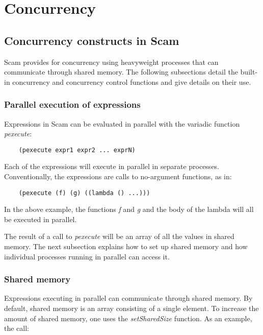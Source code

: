 \chapter{Concurrency}
\label{Concurrency}

\section{Concurrency constructs in Scam}

Scam provides for concurrency using heavyweight processes that
can communicate through shared memory. The following subsections
detail the built-in concurrency and concurrency control
functions and give details on
their use.

\subsection{Parallel execution of expressions}

Expressions in Scam can be evaluated in parallel with the variadic function
{\it pexecute}:

\begin{verbatim}
    (pexecute expr1 expr2 ... exprN)
\end{verbatim}

Each of the expressions will execute in parallel in separate processes.
Conventionally, the expressions are calls to no-argument functions, as in:

\begin{verbatim}
    (pexecute (f) (g) ((lambda () ...)))
\end{verbatim}

In the above example, the functions {\it f} and {\it g}
and the body of the lambda
will all be executed in parallel.

The result of a call to {\it pexecute} will be an array of all the values
in shared memory. The next subsection explains how to set up shared
memory and how individual processes running in parallel can access
it.

\subsection{Shared memory}

Expressions executing in parallel can communicate through shared memory.
By default, shared memory is an array consisting of a single element.
To increase the amount of shared memory, one uses the {\it setSharedSize}
function.
As an example, the call:


